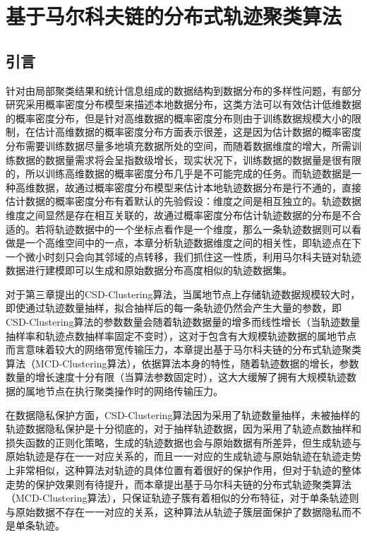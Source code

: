 \chapter{基于马尔科夫链的分布式轨迹聚类算法}


\section{引言}
针对由局部聚类结果和统计信息组成的数据结构到数据分布的多样性问题，有部分研究采用概率密度分布模型来描述本地数据分布，这类方法可以有效估计低维数据的概率密度分布，但是针对高维数据的概率密度分布则由于训练数据规模大小的限制，在估计高维数据的概率密度分布方面表示很差，这是因为估计数据的概率密度分布需要训练数据尽量多地填充数据所处的空间，而随着数据维度的增大，所需训练数据的数据量需求将会呈指数级增长，现实状况下，训练数据的数据量是很有限的，所以训练高维数据的概率密度分布几乎是不可能完成的任务。而轨迹数据是一种高维数据，故通过概率密度分布模型来估计本地轨迹数据分布是行不通的，直接估计数据的概率密度分布有着默认的先验假设：维度之间是相互独立的。轨迹数据维度之间显然是存在相互关联的，故通过概率密度分布估计轨迹数据的分布是不合适的。若将轨迹数据中的一个坐标点看作是一个维度，那么一条轨迹数据则可以看做是一个高维空间中的一点，本章分析轨迹数据维度之间的相关性，即轨迹点在下一个微小时刻只会向其邻域的点转移，我们抓住这一性质，利用马尔科夫链对轨迹数据进行建模即可以生成和原始数据分布高度相似的轨迹数据集。

对于第三章提出的CSD-Clustering算法，当属地节点上存储轨迹数据规模较大时，即使通过轨迹数量抽样，拟合抽样后的每一条轨迹仍然会产生大量的参数，即CSD-Clustering算法的参数数量会随着轨迹数据量的增多而线性增长（当轨迹数量抽样率和轨迹点数抽样率固定不变时），这对于包含有大规模轨迹数据的属地节点而言意味着较大的网络带宽传输压力，本章提出基于马尔科夫链的分布式轨迹聚类算法（MCD-Clustering算法），依据算法本身的特性，随着轨迹数据的增长，参数数量的增长速度十分有限（当算法参数固定时），这大大缓解了拥有大规模轨迹数据的属地节点在执行聚类操作时的网络传输压力。

在数据隐私保护方面，CSD-Clustering算法因为采用了轨迹数量抽样，未被抽样的轨迹数据隐私保护是十分彻底的，对于抽样轨迹数据，因为采用了轨迹点数抽样和损失函数的正则化策略，生成的轨迹数据也会与原始数据有所差异，但生成轨迹与原始轨迹是存在一一对应关系的，而且一一对应的生成轨迹与原始轨迹在轨迹走势上非常相似，这种算法对轨迹的具体位置有着很好的保护作用，但对于轨迹的整体走势的保护效果则有待提升，而本章提出基于马尔科夫链的分布式轨迹聚类算法（MCD-Clustering算法），只保证轨迹子簇有着相似的分布特征，对于单条轨迹则与原始数据不存在一一对应的关系，这种算法从轨迹子簇层面保护了数据隐私而不是单条轨迹。

